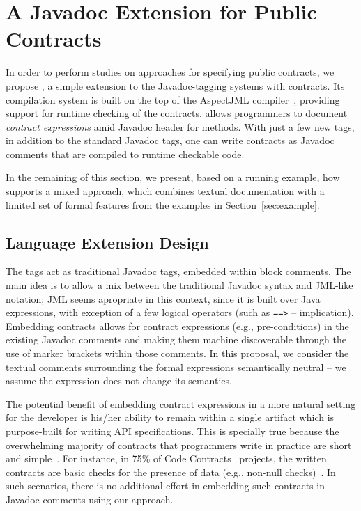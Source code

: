 \section{A Javadoc Extension for Public Contracts}
\label{sec:approach}

In order to perform studies on approaches for specifying public contracts, we propose \contractjdoc{}, a simple extension to the Javadoc-tagging systems with contracts. Its compilation system is built on the top of the AspectJML compiler~\cite{aspectjml}, providing support for runtime checking of the contracts.
\contractjdoc{} allows programmers to document \emph{contract expressions} amid Javadoc header for methods. With just a few new tags, in addition to the standard Javadoc tags, one can write contracts as Javadoc comments that are compiled to runtime checkable code. 

In the remaining of this section, we present, based on a running example, how \contractjdoc{} supports a mixed approach, which combines textual documentation with a limited set of formal features from the examples in Section~\ref{sec:example}.

\subsection{Language Extension Design}

The \contractjdoc{} tags act as traditional Javadoc tags,  embedded within block comments. 
The main idea is to allow a mix between the traditional Javadoc syntax and JML-like notation; 
JML seems apropriate in this context, since it is built over Java expressions, with exception of a few logical operators (such as \texttt{==>} -- implication).
Embedding contracts allows for contract expressions (e.g., pre-conditions) in the existing Javadoc comments
and making them machine discoverable through the use of
marker brackets within those comments.
In this proposal, we consider the textual comments surrounding the formal expressions semantically neutral -- we assume the expression does not change its semantics. 

The potential benefit of embedding contract expressions in a more natural setting for the developer is his/her ability to remain within a single artifact which is purpose-built for writing API specifications. 
This is specially true because the overwhelming majority of contracts that programmers write in
practice are short and simple~\cite{Estler-etal14,typeContracts}. For instance, in 75\% of Code Contracts~\cite{codeContractsPaper} projects, the written contracts are basic checks for the presence of data (e.g., non-null checks)~\cite{typeContracts}. In such scenarios, there is no additional effort in embedding such contracts in Javadoc comments using our \contractjdoc{} approach.

